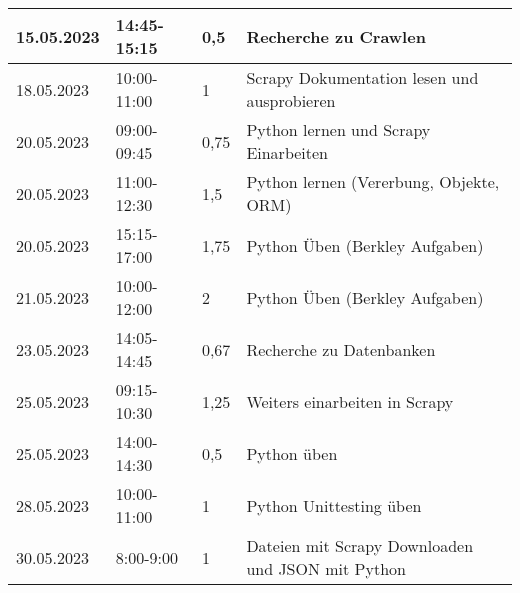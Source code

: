 \begin{flushleft}
\begin{longtable}{p{2cm}p{}p{2cm}p{}}
    			15.05.2023 & 14:45-15:15 & 0,5 & Recherche zu Crawlen\\ \midrule
    			18.05.2023 & 10:00-11:00 & 1 & Scrapy Dokumentation lesen und ausprobieren\\ \midrule
    			20.05.2023 & 09:00-09:45 & 0,75 & Python lernen und Scrapy Einarbeiten\\ \midrule
    			20.05.2023 & 11:00-12:30 & 1,5 & Python lernen (Vererbung, Objekte, ORM)\\ \midrule
    			20.05.2023 & 15:15-17:00 & 1,75 & Python Üben (Berkley Aufgaben)\\ \midrule
    			21.05.2023 & 10:00-12:00 & 2 & Python Üben (Berkley Aufgaben)\\ \midrule
			23.05.2023 & 14:05-14:45 & 0,67 & Recherche zu Datenbanken\\ \midrule
			25.05.2023 & 09:15-10:30 & 1,25 & Weiters einarbeiten in Scrapy\\ \midrule
			25.05.2023 & 14:00-14:30 & 0,5 & Python üben\\ \midrule
			28.05.2023 & 10:00-11:00 & 1 & Python Unittesting üben\\ \midrule
			30.05.2023 & 8:00-9:00 & 1 & Dateien mit Scrapy Downloaden und JSON mit Python\\ \midrule

            \bottomrule
    \end{longtable}
\end{flushleft}